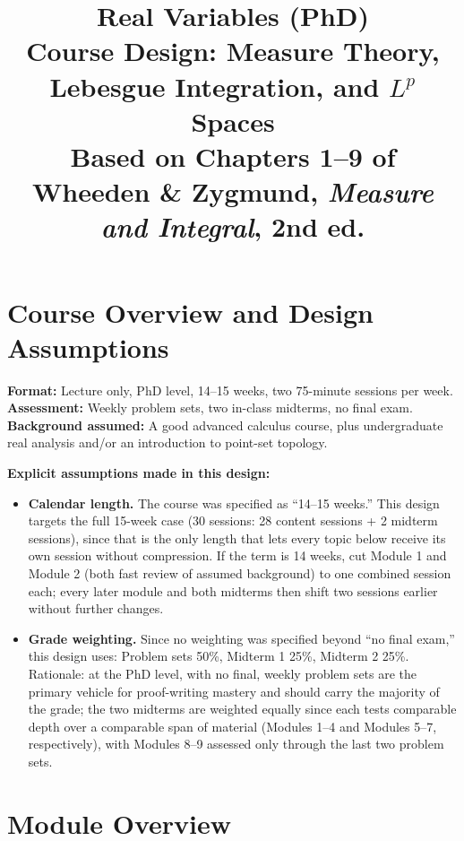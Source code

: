 \documentclass[11pt]{article}
\title{Real Variables (PhD) \\ \large Course Design: Measure Theory, Lebesgue Integration, and $L^p$ Spaces \\ \normalsize Based on Chapters 1--9 of Wheeden \& Zygmund, \emph{Measure and Integral}, 2nd ed.}
\author{}
\date{}
\begin{document}
\maketitle

\section{Course Overview and Design Assumptions}

\textbf{Format:} Lecture only, PhD level, 14--15 weeks, two 75-minute sessions per week.
\textbf{Assessment:} Weekly problem sets, two in-class midterms, no final exam.
\textbf{Background assumed:} A good advanced calculus course, plus undergraduate real analysis and/or an introduction to point-set topology.

\textbf{Explicit assumptions made in this design:}
\begin{itemize}
\item \textbf{Calendar length.} The course was specified as ``14--15 weeks.'' This design targets the full 15-week case (30 sessions: 28 content sessions + 2 midterm sessions), since that is the only length that lets every topic below receive its own session without compression. If the term is 14 weeks, cut Module 1 and Module 2 (both fast review of assumed background) to one combined session each; every later module and both midterms then shift two sessions earlier without further changes.
\item \textbf{Grade weighting.} Since no weighting was specified beyond ``no final exam,'' this design uses: Problem sets 50\%, Midterm 1 25\%, Midterm 2 25\%. Rationale: at the PhD level, with no final, weekly problem sets are the primary vehicle for proof-writing mastery and should carry the majority of the grade; the two midterms are weighted equally since each tests comparable depth over a comparable span of material (Modules 1--4 and Modules 5--7, respectively), with Modules 8--9 assessed only through the last two problem sets.
\end{itemize}

\section{Module Overview}
\end{document}
